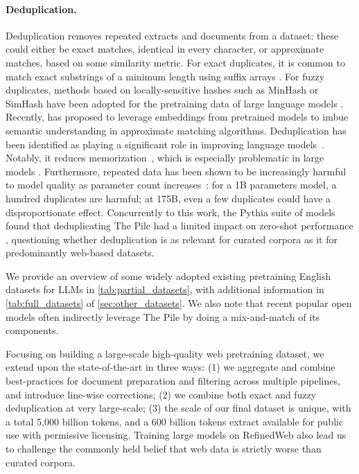 \paragraph{Deduplication.} Deduplication removes repeated extracts and documents from a dataset: these could either be exact matches, identical in every character, or approximate matches, based on some similarity metric. For exact duplicates, it is common to match exact substrings of a minimum length using suffix arrays \cite{manber1993suffix}. For fuzzy duplicates, methods based on locally-sensitive hashes such as MinHash \cite{broder1997resemblance} or SimHash \cite{charikar2002similarity} have been adopted for the pretraining data of large language models \cite{brown2020language, zeng2021pangu, gopher}. Recently, \citet{abbas2023semdedup} has proposed to leverage embeddings from pretrained models to imbue semantic understanding in approximate matching algorithms.  Deduplication has been identified as playing a significant role in improving language models~\cite{allamanis2019adverse, lee2022deduplicating}. Notably, it reduces memorization~\cite{carlini2022quantifying}, which is especially problematic in large models \cite{carlini2021extracting}. Furthermore, repeated data has been shown to be increasingly harmful to model quality as parameter count increases~\cite{hernandez2022scaling}: for a 1B parameters model, a hundred duplicates are harmful; at 175B, even a few duplicates could have a disproportionate effect. Concurrently to this work, the Pythia suite of models found that deduplicating The Pile had a limited impact on zero-shot performance \cite{biderman2023pythia}, questioning whether deduplication is as relevant for curated corpora as it for predominantly web-based datasets.

We provide an overview of some widely adopted existing pretraining English datasets for LLMs in \ref{tab:partial_datasets}, with additional information in \ref{tab:full_datasets} of \ref{sec:other_datasets}. We also note that recent popular open models \cite{zhang2022opt, touvron2023llama} often indirectly leverage The Pile \cite{gao2020pile} by doing a mix-and-match of its components.

Focusing on building a large-scale high-quality web pretraining dataset, we extend upon the state-of-the-art in three ways: (1) we aggregate and combine best-practices for document preparation and filtering across multiple pipelines, and introduce line-wise corrections; (2) we combine both exact and fuzzy deduplication at very large-scale; (3) the scale of our final dataset is unique, with a total 5,000 billion tokens, and a 600 billion tokens extract available for public use with permissive licensing. Training large models on RefinedWeb also lead us to challenge the commonly held belief that web data is strictly worse than curated corpora.

